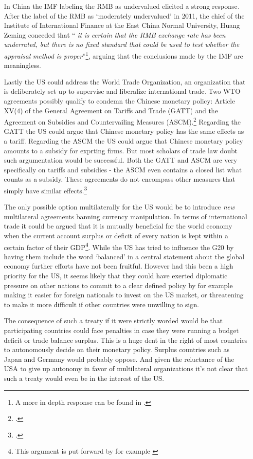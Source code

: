 In China the IMF labeling the RMB as undervalued elicited a strong 
response. After the label of the RMB as `moderately undervalued' in 
2011, the chief of the Institute of International Finance at the East 
China Normal University, Huang Zeming conceded that ``\textit{ it is 
	certain that the RMB exchange rate has been underrated, but there is 
	no fixed standard that could be used to test whether the appraisal 
method is proper}''\footnote{A more in depth response can be found in 
\cite{ChinaDaily11}.}, arguing that the conclusions made by the IMF are 
meaningless.

Lastly the US could address the World Trade Organization, an organization that is deliberately set up to supervise 
and liberalize international trade. Two WTO agreements possibly qualify to condemn the Chinese monetary policy: Article XV(4) of the General Agreement on Tariffs and Trade (GATT) and the Agreement on Subsidies and Countervailing Measures (ASCM).\footnote{\cite[pp. 135]{Waibel2010}.} Regarding the GATT the US could argue that Chinese monetary policy has the same effects as a tariff. Regarding the ASCM the US could argue that Chinese monetary policy amounts to a subsidy for exprting firms. But most scholars of trade law doubt such argumentation would be successful. Both the GATT and ASCM are very specifically on tariffs and subsidies - the ASCM even contains a closed list what counts as a subsidy. These agreements  do not encompass other measures that simply have similar effects.\footnote{\cite{Waibel2010}.}

The only possible option multilaterally for the US would be to introduce \emph{new} multilateral agreements banning currency manipulation. In terms of international trade it could be argued that it is mutually 
beneficial for the world economy when the current account surplus or 
deficit of every nation is kept within a certain factor of their 
GDP\footnote{This argument is put forward by for example 
\cite{cline2009}}. While the US has tried to influence the G20 by having 
them include the word `balanced' in a central statement about the global 
economy further efforts have not been fruitful. However had this been a 
high priority for the US, it seems likely that they could have exerted 
diplomatic pressure on other nations to commit to a clear defined policy 
by for example making it easier for foreign nationals to invest on the 
US market, or threatening to make it more difficult if other countries 
were unwilling to sign.

The consequence of such a treaty if it were strictly worded would be 
that participating countries could face penalties in case they were 
running a budget deficit or trade balance surplus.  This is a huge dent 
in the right of most countries to autonomously decide on their monetary 
policy. Surplus countries such as Japan and Germany would probably oppose. And given the reluctance of the USA to give up autonomy in favor of multilateral organizations it's not clear that such a treaty 
would even be in the interest of the US.

